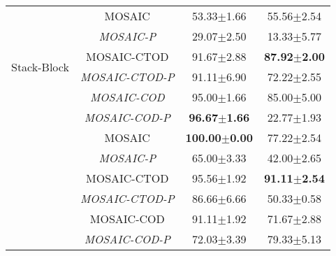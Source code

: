 \begin{table}
{\begin{tabular}{|c|c|c|c|}
  \multirow{6}{*}{Stack-Block} & MOSAIC & 53.33$\pm$1.66 & 55.56$\pm$2.54 \\ 
  \cline{2-4}
   & \textit{MOSAIC-P} & 29.07$\pm$2.50 & 13.33$\pm$5.77 \\ 
  \cline{2-4}
   & MOSAIC-CTOD & 91.67$\pm$2.88 & \textbf{87.92$\pm$2.00} \\ 
  \cline{2-4}
   & \textit{MOSAIC-CTOD-P} & 91.11$\pm$6.90 & 72.22$\pm$2.55 \\ 
  \cline{2-4}
   & \textit{MOSAIC-COD} & 95.00$\pm$1.66 & 85.00$\pm$5.00 \\ 
  \cline{2-4}
   & \textit{MOSAIC-COD-P} & \textbf{96.67$\pm$1.66} & 22.77$\pm$1.93 \\ 
  \hhline{|====|}
  \multirow{6}{*}{Press-Button} & MOSAIC & \textbf{100.00$\pm$0.00} & 77.22$\pm$2.54 \\ 
  \cline{2-4}
   & \textit{MOSAIC-P} & 65.00$\pm$3.33 & 42.00$\pm$2.65 \\ 
  \cline{2-4}
   & MOSAIC-CTOD & 95.56$\pm$1.92 & \textbf{91.11$\pm$2.54} \\ 
  \cline{2-4}
   & \textit{MOSAIC-CTOD-P} & 86.66$\pm$6.66 & 50.33$\pm$0.58 \\ 
  \cline{2-4}
   & MOSAIC-COD & 91.11$\pm$1.92 & 71.67$\pm$2.88 \\ 
  \cline{2-4}
   & \textit{MOSAIC-COD-P} & 72.03$\pm$3.39 & 79.33$\pm$5.13 \\
  \hline
  \end{tabular}
  }
  \end{table}